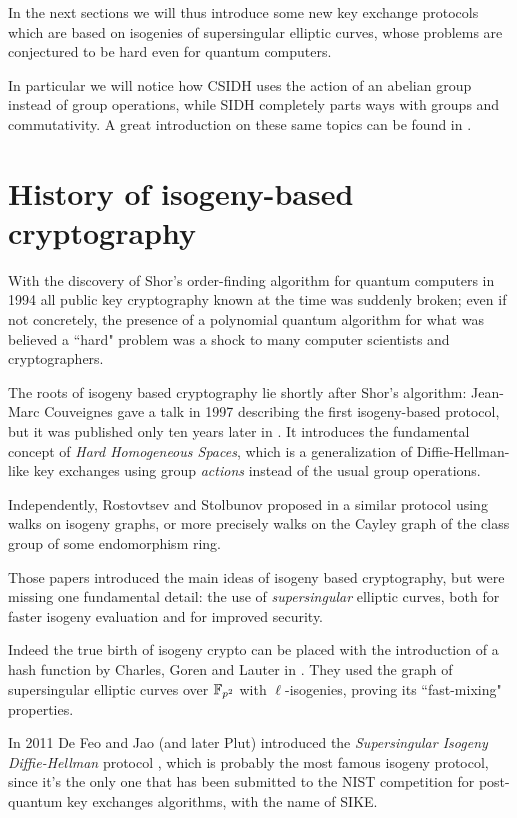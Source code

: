 In the next sections we will thus introduce some new key exchange protocols which are based on isogenies of supersingular elliptic curves, whose problems are conjectured to be hard even for quantum computers.

In particular we will notice how CSIDH uses the action of an abelian group instead of group operations, while SIDH completely parts ways with groups and commutativity. A great introduction on these same topics can be found in \cite{Smith_DH}.


\section{History of isogeny-based cryptography}
With the discovery of Shor's order-finding algorithm for quantum computers in 1994 all public key cryptography known at the time was suddenly broken; even if not concretely, the presence of a polynomial quantum algorithm for what was believed a ``hard" problem was a shock to many computer scientists and cryptographers.

The roots of isogeny based cryptography lie shortly after Shor's algorithm: Jean-Marc Couveignes gave a talk in 1997 describing the first isogeny-based protocol, but it was published only ten years later in \cite{Couveignes}. It introduces the fundamental concept of \emph{Hard Homogeneous Spaces}, which is a generalization of Diffie-Hellman-like key exchanges using group \emph{actions} instead of the usual group operations.

Independently, Rostovtsev and Stolbunov proposed in \cite{Rostovtsev} a similar protocol using walks on isogeny graphs, or more precisely walks on the Cayley graph of the class group of some endomorphism ring.

Those papers introduced the main ideas of isogeny based cryptography, but were missing one fundamental detail: the use of \emph{supersingular} elliptic curves, both for faster isogeny evaluation and for improved security.

Indeed the true birth of isogeny crypto can be placed with the introduction of a hash function by Charles, Goren and Lauter in \cite{CGL}. They used the graph of supersingular elliptic curves over $\mathbb{F}_{p^2}$ with $\ell$-isogenies, proving its ``fast-mixing" properties.

In 2011 De Feo and Jao (and later Plut) introduced the \emph{Supersingular Isogeny Diffie-Hellman} protocol \cite{SIDH11}, which is probably the most famous isogeny protocol, since it's the only one that has been submitted to the NIST competition for post-quantum key exchanges algorithms, with the name of SIKE.


